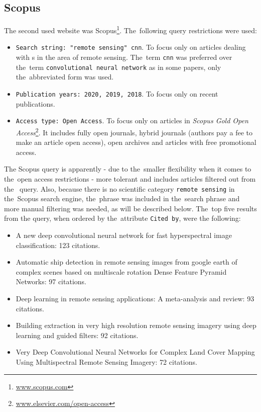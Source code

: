 \subsection{Scopus}
\label{scopus-papers}

The second used website was Scopus\footnote{\url{www.scopus.com}}. The~following query restrictions were used:

\begin{itemize}
	\item \verb|Search string: "remote sensing" cnn|. To focus only on articles dealing with s in the area of remote sensing. The~term \verb|cnn| was preferred over the~term \verb|convolutional neural network| as in some papers, only the~abbreviated form was used.
	\item \verb|Publication years: 2020, 2019, 2018|. To focus only on recent publications.
	\item \verb|Access type: Open Access|. To focus only on articles in \textit{Scopus Gold Open Access}\footnote{\url{www.elsevier.com/open-access}}. It includes fully open journals, hybrid journals (authors pay a fee to make an article open access), open archives and articles with free promotional access.
\end{itemize}

\noindent The Scopus query is apparently - due to the~smaller flexibility when it comes to the~open access restrictions - more tolerant and includes articles filtered out from the~ query. Also, because there is no scientific category \verb|remote sensing| in the~Scopus search engine, the~phrase was included in the~search phrase and more manual filtering was needed, as will be described below. The~top five results from the query, when ordered by the~attribute \verb|Cited by|, were the following:

\begin{itemize}
	\item A new deep convolutional neural network for fast hyperspectral image classification: 123 citations.  \cite{cnn-hs-class}
	\item Automatic ship detection in remote sensing images from google earth of complex scenes based on multiscale rotation Dense Feature Pyramid Networks: 97 citations. \cite{ship-rdfpn}
	\item Deep learning in remote sensing applications: A meta-analysis and review: 93 citations. \cite{dl-remote-sensing-review}
	\item Building extraction in very high resolution remote sensing imagery using deep learning and guided filters: 92 citations. \cite{vhr-building}
	\item Very Deep Convolutional Neural Networks for Complex Land Cover Mapping Using Multispectral Remote Sensing Imagery: 72 citations. \cite{very-deep-cnn-lc}
\end{itemize}


